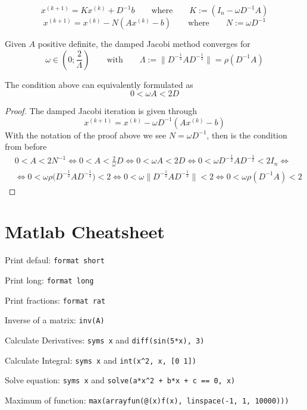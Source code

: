 \begin{definition}
   \[x^{(k+1)} = Kx^{(k)} + D^{-1}b \qquad\text{where}\qquad K := (I_n - \omega D^{-1}A)\]
   \[x^{(k+1)} = x^{(k)} - N(Ax^{(k)} - b) \qquad\text{where}\qquad N := \omega D^{-1}\]
\end{definition}

\begin{theorem}
   Given \(A\) positive definite, the damped Jacobi method converges for
   \[\omega \in \left(0; \frac{2}{\Lambda}\right) \qquad\text{with}\qquad \Lambda := \|D^{-\frac{1}{2}}AD^{-\frac{1}{2}}\| = \rho(D^{-1}A)\]
\end{theorem}
\begin{remark}
   The condition above can equivalently formulated as
   \[0 < \omega A < 2D\]
\end{remark}
\begin{proof}
   The damped Jacobi iteration is given through
   \[x^{(k+1)} = x^{(k)} - \omega D^{-1}(Ax^{(k)} - b)\]
   With the notation of the proof above we see \(N = \omega D^{-1}\), then is the condition from before
   \begin{equation*}
      \begin{split}
         & 0 < A < 2N^{-1} \iff 0 < A < \frac{2}{\omega}D \iff 0 < \omega A < 2D \iff 0 < \omega D^{-\frac{1}{2}}AD^{-\frac{1}{2}} < 2I_n \iff \\
         & \iff 0 < \omega \rho\Big(D^{-\frac{1}{2}}AD^{-\frac{1}{2}}\Big) < 2 \iff 0 < \omega \|D^{-\frac{1}{2}}AD^{-\frac{1}{2}}\| < 2 \iff 0 < \omega \rho(D^{-1}A) < 2
      \end{split}
   \end{equation*}
\end{proof}

\section{Matlab Cheatsheet}
Print defaul: \lstinline|format short|

Print long: \lstinline|format long|

Print fractions: \lstinline|format rat|

Inverse of a matrix: \lstinline|inv(A)|

Calculate Derivatives: \lstinline|syms x| and \lstinline|diff(sin(5*x), 3)|

Calculate Integral: \lstinline|syms x| and \lstinline|int(x^2, x, [0 1])|

Solve equation: \lstinline|syms x| and \lstinline|solve(a*x^2 + b*x + c == 0, x)|

Maximum of function: \lstinline|max(arrayfun(@(x)f(x), linspace(-1, 1, 10000)))|
